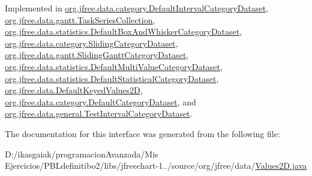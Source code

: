 Implemented in \mbox{\hyperlink{classorg_1_1jfree_1_1data_1_1category_1_1_default_interval_category_dataset_a675e42c05d2be1193e867907ad490995}{org.\+jfree.\+data.\+category.\+Default\+Interval\+Category\+Dataset}}, \mbox{\hyperlink{classorg_1_1jfree_1_1data_1_1gantt_1_1_task_series_collection_ab786a9bbf3021d71aa0324257401ec8c}{org.\+jfree.\+data.\+gantt.\+Task\+Series\+Collection}}, \mbox{\hyperlink{classorg_1_1jfree_1_1data_1_1statistics_1_1_default_box_and_whisker_category_dataset_ad81af186cdf52a94633a5a1a3d3200ba}{org.\+jfree.\+data.\+statistics.\+Default\+Box\+And\+Whisker\+Category\+Dataset}}, \mbox{\hyperlink{classorg_1_1jfree_1_1data_1_1category_1_1_sliding_category_dataset_a58d00a9725b902d17505e968469d9843}{org.\+jfree.\+data.\+category.\+Sliding\+Category\+Dataset}}, \mbox{\hyperlink{classorg_1_1jfree_1_1data_1_1gantt_1_1_sliding_gantt_category_dataset_a23369183133f92682f73909a56b913b7}{org.\+jfree.\+data.\+gantt.\+Sliding\+Gantt\+Category\+Dataset}}, \mbox{\hyperlink{classorg_1_1jfree_1_1data_1_1statistics_1_1_default_multi_value_category_dataset_ada4d7993c0081ec75a774e5fa7e58255}{org.\+jfree.\+data.\+statistics.\+Default\+Multi\+Value\+Category\+Dataset}}, \mbox{\hyperlink{classorg_1_1jfree_1_1data_1_1statistics_1_1_default_statistical_category_dataset_a47a00a30734d34a1d7664f5cc077b277}{org.\+jfree.\+data.\+statistics.\+Default\+Statistical\+Category\+Dataset}}, \mbox{\hyperlink{classorg_1_1jfree_1_1data_1_1_default_keyed_values2_d_a41bc5c5a2d789f49b7cf210a13f37a5a}{org.\+jfree.\+data.\+Default\+Keyed\+Values2D}}, \mbox{\hyperlink{classorg_1_1jfree_1_1data_1_1category_1_1_default_category_dataset_a981ce76eb60f9627756108f7f7a49933}{org.\+jfree.\+data.\+category.\+Default\+Category\+Dataset}}, and \mbox{\hyperlink{classorg_1_1jfree_1_1data_1_1general_1_1_test_interval_category_dataset_aae33ee91dff2730d64a95434a47b1e5f}{org.\+jfree.\+data.\+general.\+Test\+Interval\+Category\+Dataset}}.



The documentation for this interface was generated from the following file\+:\begin{DoxyCompactItemize}
\item 
D\+:/ikasgaiak/programacion\+Avanzada/\+Mis Ejercicios/\+P\+B\+Ldefinitibo2/libs/jfreechart-\/1../source/org/jfree/data/\mbox{\hyperlink{_values2_d_8java}{Values2\+D.\+java}}\end{DoxyCompactItemize}
